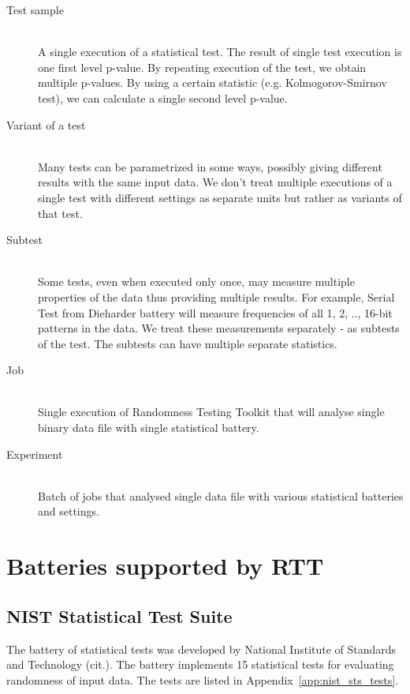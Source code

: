 \documentclass[
  digital,  	%
  color,		%
  oneside,   	%
  12pt,
  nocover,
  notable,
  nolof,
  nolot,
]{fithesis3}
\theoremstyle{definition}
\theoremstyle{remark}
\begin{document}
\begin{description}
\item[Test sample] \hfill \\
A single execution of a statistical test. The result of single test execution is one first level p-value. By repeating execution of the test, we obtain multiple p-values. By using a certain statistic (e.g. Kolmogorov-Smirnov test), we can calculate a single second level p-value.

\item[Variant of a test] \hfill \\
Many tests can be parametrized in some ways, possibly giving different results with the same input data. We don't treat multiple executions of a single test with different settings as separate units but rather as variants of that test.

\item[Subtest] \hfill \\
Some tests, even when executed only once, may measure multiple properties of the data thus providing multiple results. For example, Serial Test from Dieharder battery will measure frequencies of all 1, 2, .., 16-bit patterns in the data. We treat these measurements separately - as subtests of the test. The subtests can have multiple separate statistics.

\item[Job] \hfill \\
Single execution of Randomness Testing Toolkit that will analyse single binary data file with single statistical battery.

\item[Experiment] \hfill \\
Batch of jobs that analysed single data file with various statistical batteries and settings.

\end{description}

\section{Batteries supported by RTT}
\subsection{NIST Statistical Test Suite}
The battery of statistical tests was developed by National Institute of Standards and Technology (cit.). The battery implements 15 statistical tests for evaluating randomness of input data. The tests are listed in Appendix~\ref{app:nist_sts_tests}.
\end{document}
